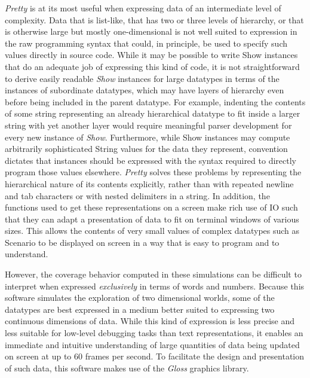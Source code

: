 \textit{Pretty} is at its most useful when expressing data of an intermediate level of complexity. Data that is list-like, that has two or three levels of hierarchy, or that is otherwise large but mostly one-dimensional is not well suited to expression in the raw programming syntax that could, in principle, be used to specify such values directly in source code. While it may be possible to write Show instances that do an adequate job of expressing this kind of code, it is not straightforward to derive easily readable \textit{Show} instances for large datatypes in terms of the instances of subordinate datatypes, which may have layers of hierarchy even before being included in the parent datatype. For example, indenting the contents of some string representing an already hierarchical datatype to fit inside a larger string with yet another layer would require meaningful parser development for every new instance of \textit{Show}. Furthermore, while Show instances may compute arbitrarily sophisticated String values for the data they represent, convention dictates that instances should be expressed with the syntax required to directly program those values elsewhere. \textit{Pretty} solves these problems by representing the hierarchical nature of its contents explicitly, rather than with repeated newline and tab characters or with nested delimiters in a string. In addition, the functions used to get these representations on a screen make rich use of IO such that they can adapt a presentation of data to fit on terminal windows of various sizes. This allows the contents of very small values of complex datatypes such as Scenario to be displayed on screen in a way that is easy to program and to understand.

However, the coverage behavior computed in these simulations can be difficult to interpret when expressed \textit{exclusively} in terms of words and numbers. Because this software simulates the exploration of two dimensional worlds, some of the datatypes are best expressed in a medium better suited to expressing two continuous dimensions of data. While this kind of expression is less precise and less suitable for low-level debugging tasks than text representations, it enables an immediate and intuitive understanding of large quantities of data being updated on screen at up to 60 frames per second. To facilitate the design and presentation of such data, this software makes use of the \textit{Gloss} graphics library.

